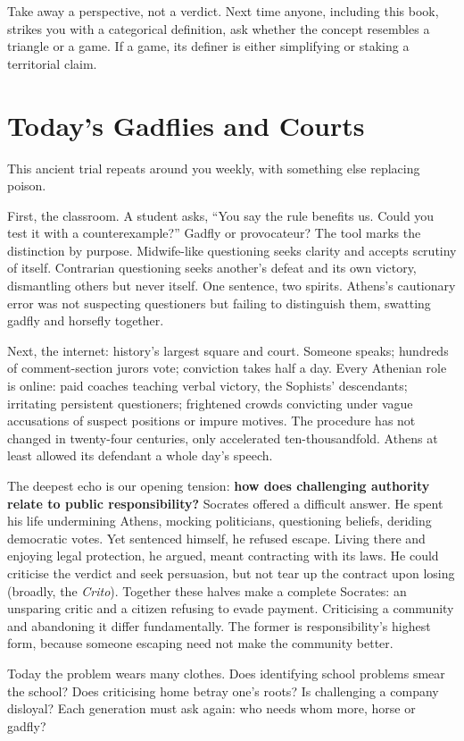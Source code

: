 Take away a perspective, not a verdict. Next time anyone, including this book, strikes you with a categorical definition, ask whether the concept resembles a triangle or a game. If a game, its definer is either simplifying or staking a territorial claim.

\section{Today's Gadflies and Courts}
This ancient trial repeats around you weekly, with something else replacing poison.

First, the classroom. A student asks, ``You say the rule benefits us. Could you test it with a counterexample?'' Gadfly or provocateur? The tool marks the distinction by purpose. Midwife-like questioning seeks clarity and accepts scrutiny of itself. Contrarian questioning seeks another's defeat and its own victory, dismantling others but never itself. One sentence, two spirits. Athens's cautionary error was not suspecting questioners but failing to distinguish them, swatting gadfly and horsefly together.

Next, the internet: history's largest square and court. Someone speaks; hundreds of comment-section jurors vote; conviction takes half a day. Every Athenian role is online: paid coaches teaching verbal victory, the Sophists' descendants; irritating persistent questioners; frightened crowds convicting under vague accusations of suspect positions or impure motives. The procedure has not changed in twenty-four centuries, only accelerated ten-thousandfold. Athens at least allowed its defendant a whole day's speech.

The deepest echo is our opening tension: \textbf{how does challenging authority relate to public responsibility?} Socrates offered a difficult answer. He spent his life undermining Athens, mocking politicians, questioning beliefs, deriding democratic votes. Yet sentenced himself, he refused escape. Living there and enjoying legal protection, he argued, meant contracting with its laws. He could criticise the verdict and seek persuasion, but not tear up the contract upon losing (broadly, the \textit{Crito}). Together these halves make a complete Socrates: an unsparing critic and a citizen refusing to evade payment. Criticising a community and abandoning it differ fundamentally. The former is responsibility's highest form, because someone escaping need not make the community better.

Today the problem wears many clothes. Does identifying school problems smear the school? Does criticising home betray one's roots? Is challenging a company disloyal? Each generation must ask again: who needs whom more, horse or gadfly?

